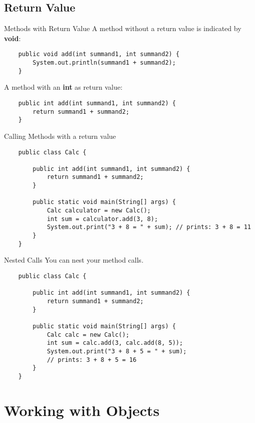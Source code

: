 \subsection{Return Value}
\begin{frame}[fragile]{Methods with Return Value}
	A method without a return value is indicated by \textbf{void}:
	\begin{lstlisting}
	public void add(int summand1, int summand2) {
	    System.out.println(summand1 + summand2);
	}
	\end{lstlisting}
	A method with an \textbf{int} as return value:
	\begin{lstlisting}
	public int add(int summand1, int summand2) {
	    return summand1 + summand2;
	}
	\end{lstlisting}
\end{frame}

\begin{frame}[fragile]{Calling Methods with a return value}
	\begin{lstlisting}
	public class Calc {
	
	    public int add(int summand1, int summand2) {
	        return summand1 + summand2;
	    }
	    
	    public static void main(String[] args) {
	        Calc calculator = new Calc();
	        int sum = calculator.add(3, 8);
	        System.out.print("3 + 8 = " + sum); // prints: 3 + 8 = 11
	    }
	}
	\end{lstlisting}
\end{frame}

\begin{frame}[fragile]{Nested Calls}
	You can nest your method calls.
	\begin{lstlisting}
	public class Calc {
	
	    public int add(int summand1, int summand2) {
	        return summand1 + summand2;
	    }
	    
	    public static void main(String[] args) {
	        Calc calc = new Calc();
	        int sum = calc.add(3, calc.add(8, 5));
	        System.out.print("3 + 8 + 5 = " + sum); 
	        // prints: 3 + 8 + 5 = 16
	    }
	}
	\end{lstlisting}
\end{frame}

\section{Working with Objects}
